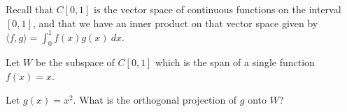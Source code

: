 \edXsolution{ 
}

\endedxproblem



Recall that $C[0,1]$ is the vector space of continuous functions on the interval $[0,1]$, and that
we have an inner product on that vector space given by $\langle f, g \rangle = \int_0^1 f(x)g(x) \ dx$.  


Let $W$ be the subspace of $C[0,1]$ which is the span of a single function 
$f(x) = x$.  

Let $g(x) = x^2$.  What is the orthogonal projection of $g$ onto $W$?  


\\


\edXsolution{ 
}

\endedxproblem


\endedxvertical







\endedxvertical

